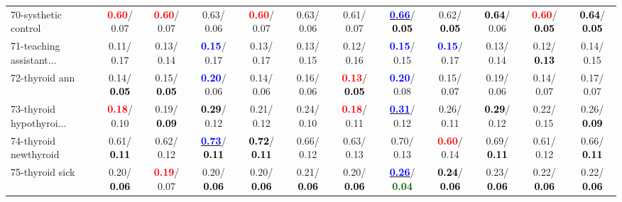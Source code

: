 \begin{table}[h]
\begin{center}
{\begin{tabular}{lc|c|c|c|c|c|c|c|c|c|c}
70-systhetic control & \textcolor{red}{\textbf{  0.60}}/  0.07 & \textcolor{red}{\textbf{  0.60}}/  0.07 &   0.63/  0.06 & \textcolor{red}{\textbf{  0.60}}/  0.07 &   0.63/  0.06 &   0.61/  0.07 & \underline{\textcolor{blue}{\textbf{  0.66}}}/\textcolor{black}{\textbf{  0.05}} &   0.62/\textcolor{black}{\textbf{  0.05}} & \textcolor{black}{\textbf{  0.64}}/  0.06 & \textcolor{red}{\textbf{  0.60}}/\textcolor{black}{\textbf{  0.05}} & \textcolor{black}{\textbf{  0.64}}/\textcolor{black}{\textbf{  0.05}} \\
71-teaching assistant... &   0.11/  0.17 &   0.13/  0.14 & \textcolor{blue}{\textbf{  0.15}}/  0.17 &   0.13/  0.17 &   0.13/  0.15 &   0.12/  0.16 & \textcolor{blue}{\textbf{  0.15}}/  0.15 & \textcolor{blue}{\textbf{  0.15}}/  0.17 &   0.13/  0.14 &   0.12/\textcolor{black}{\textbf{  0.13}} &   0.14/  0.15 \\ \hline
72-thyroid ann &   0.14/\textcolor{black}{\textbf{  0.05}} &   0.15/\textcolor{black}{\textbf{  0.05}} & \textcolor{blue}{\textbf{  0.20}}/  0.06 &   0.14/  0.06 &   0.16/  0.06 & \textcolor{red}{\textbf{  0.13}}/\textcolor{black}{\textbf{  0.05}} & \textcolor{blue}{\textbf{  0.20}}/  0.08 &   0.15/  0.07 &   0.19/  0.06 &   0.14/  0.07 &   0.17/  0.07 \\
73-thyroid hypothyroi... & \textcolor{red}{\textbf{  0.18}}/  0.10 &   0.19/\textcolor{black}{\textbf{  0.09}} & \textcolor{black}{\textbf{  0.29}}/  0.12 &   0.21/  0.12 &   0.24/  0.10 & \textcolor{red}{\textbf{  0.18}}/  0.11 & \underline{\textcolor{blue}{\textbf{  0.31}}}/  0.12 &   0.26/  0.11 & \textcolor{black}{\textbf{  0.29}}/  0.12 &   0.22/  0.15 &   0.26/\textcolor{black}{\textbf{  0.09}} \\
74-thyroid newthyroid &   0.61/\textcolor{black}{\textbf{  0.11}} &   0.62/  0.12 & \underline{\textcolor{blue}{\textbf{  0.73}}}/\textcolor{black}{\textbf{  0.11}} & \textcolor{black}{\textbf{  0.72}}/\textcolor{black}{\textbf{  0.11}} &   0.66/  0.12 &   0.63/  0.13 &   0.70/  0.13 & \textcolor{red}{\textbf{  0.60}}/  0.14 &   0.69/\textcolor{black}{\textbf{  0.11}} &   0.61/  0.12 &   0.66/\textcolor{black}{\textbf{  0.11}} \\
75-thyroid sick &   0.20/\textcolor{black}{\textbf{  0.06}} & \textcolor{red}{\textbf{  0.19}}/  0.07 &   0.20/\textcolor{black}{\textbf{  0.06}} &   0.20/\textcolor{black}{\textbf{  0.06}} &   0.21/\textcolor{black}{\textbf{  0.06}} &   0.20/\textcolor{black}{\textbf{  0.06}} & \underline{\textcolor{blue}{\textbf{  0.26}}}/\textcolor{darkgreen}{\textbf{  0.04}} & \textcolor{black}{\textbf{  0.24}}/\textcolor{black}{\textbf{  0.06}} &   0.23/\textcolor{black}{\textbf{  0.06}} &   0.22/\textcolor{black}{\textbf{  0.06}} &   0.22/\textcolor{black}{\textbf{  0.06}} \\

\end{tabular}}
\end{center}
\end{table}
